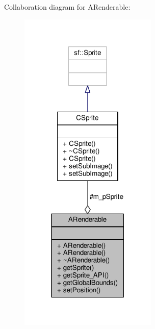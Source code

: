Collaboration diagram for A\-Renderable\-:
\nopagebreak
\begin{figure}[H]
\begin{center}
\leavevmode
\includegraphics[width=186pt]{classARenderable__coll__graph}
\end{center}
\end{figure}
